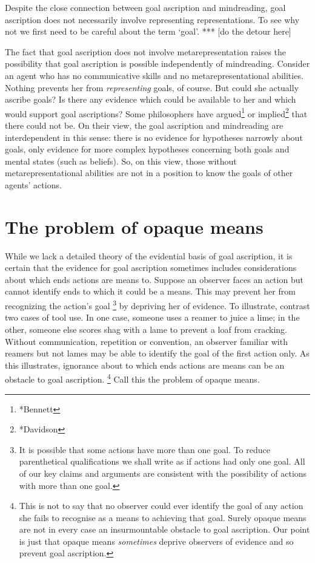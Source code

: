 \documentclass[14pt,a4paper]{extarticle}
\begin{document}
Despite the close connection between goal ascription and mindreading,
goal ascription does not necessarily involve representing representations.
To see why not we first need to be careful about the term `goal'.
***
[do the detour here]

The fact that goal ascription does not involve metarepresentation raises the possibility that goal ascription is possible independently of mindreading.
Consider an agent who has no communicative skills and no metarepresentational abilities.
Nothing prevents her from \emph{representing} goals, of course.
But could she actually ascribe goals?
Is there any evidence which could be available to her and which would support goal ascriptions?
Some philosophers have argued\footnote{*Bennett} or implied\footnote{*Davidson} that there could not be.
On their view, the goal ascription and mindreading are interdependent in this sense: 
there is no evidence for hypotheses narrowly about goals, only evidence for more complex hypotheses concerning both goals and mental states (such as beliefs).
So, on this view, those without metarepresentational abilities are not in a position to know the goals of other agents' actions.




\section{The problem of opaque means}
\label{sec:opaque_means}

While we lack a detailed theory of the evidential basis of goal ascription,
it is certain that the evidence for goal ascription sometimes includes considerations about which ends actions are means to.
Suppose an observer faces an action but cannot identify ends to which it could be a means.
This may prevent her from recognizing the action's goal%
\footnote{
It is possible that some actions have more than one goal.
To reduce parenthetical qualifications we shall write as if actions had only one goal.  
All of our key claims and arguments are consistent with the possibility of actions with more than one goal.
} 
 by depriving her of evidence.
To illustrate, contrast two cases of tool use.
In one case, someone uses a reamer to  juice  a lime; in the other, someone else scores shag with a lame to prevent a loaf from cracking.
Without communication, repetition or convention,
an observer familiar with reamers but not lames 
may be able to identify the goal of the first action only.
As this illustrates, ignorance about to which ends actions are means can be an obstacle to goal ascription.%
\footnote{
This is not to say that no observer could ever identify the goal of any action she fails to recognise as a means to achieving that goal.
Surely opaque means are not in every case an insurmountable obstacle to goal ascription.
Our point is just that opaque means \emph{sometimes}  deprive observers of evidence and so prevent goal ascription.
}
Call this the problem of opaque means.
\end{document}
